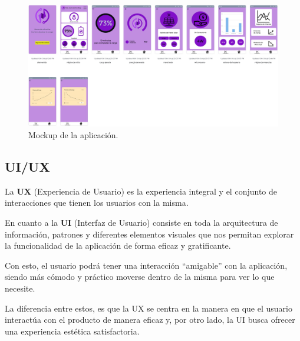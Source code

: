                 \begin{figure}[H]
                    \centering
                    \includegraphics[width=0.8\linewidth]{Aplicación/Mockup.png}
                    \caption{Mockup de la aplicación.}
                    \label{fig:a14}
                \end{figure}
                
            \subsection{UI/UX}
                La \textbf{UX} (Experiencia de Usuario) es la experiencia integral y el conjunto de interacciones que tienen los usuarios con la misma.\par
                En cuanto a la \textbf{UI} (Interfaz de Usuario) consiste en toda la arquitectura de información, patrones y diferentes elementos visuales que nos permitan explorar la funcionalidad de la aplicación de forma eficaz y gratificante.\par
                Con esto, el usuario podrá tener una interacción “amigable” con la aplicación, siendo más cómodo y práctico moverse dentro de la misma para ver lo que necesite.\par
                La diferencia entre estos, es que la UX se centra en la manera en que el usuario interactúa con el producto de manera eficaz y, por otro lado, la UI busca ofrecer una experiencia estética satisfactoria.\par

